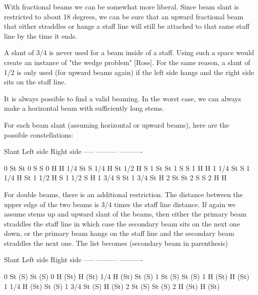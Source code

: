 With fractional beams we can be somewhat more liberal.  Since beam slant
is restricted to about 18 degrees, we can be sure that an upward
fractional beam that either straddles or hangs a staff line will still
be attached to that same staff line by the time it ends.

A slant of 3/4 is never used for a beam inside of a staff.  Using such a
space would create an instance of "the wedge problem" [Ross].  For the
same reason, a slant of 1/2 is only used (for upward beams again) if the
left side hangs and the right side sits on the staff line.

It is always possible to find a valid beaming.  In the worst case, we
can always make a horizontal beam with sufficiently long stems.  


For each beam slant (assuming horizontal or upward beams), here are the
possible constellations:

      Slant         Left side       Right side
      -----         ---------       ----------
        
        0               St              St
        0               S               S
        0               H               H
        1/4             St              S
        1/4             H               St
        1/2             H               S
        1               St              St
        1               S               S
        1               H               H
        1 1/4           St              S
        1 1/4           H               St
        1 1/2           H               S
        1 1/2           S               H
        1 3/4           S               St
        1 3/4           St              H
        2               St              St
        2               S               S
        2               H               H

For double beams, there is an additional restriction.  The distance
between the upper edge of the two beams is 3/4 times the staff line
distance.  If again we assume stems up and upward slant of the beams,
then either the primary beam straddles the staff line in which case the
secondary beam sits on the next one down, or the primary beam hangs on
the staff line and the secondary beam straddles the next one. The list
becomes (secondary beam in parenthesis)

      Slant         Left side        Right side
      -----         ---------       ----------
        
        0               St (S)          St (S)
        0               H  (St)         H  (St)
        1/4             H  (St)         St (S)
        1               St (S)          St (S)
        1               H  (St)         H  (St)
        1 1/4           H  (St)         St (S)
        1 3/4           St (S)          H  (St)
        2               St (S)          St (S)
        2               H  (St)         H  (St)

